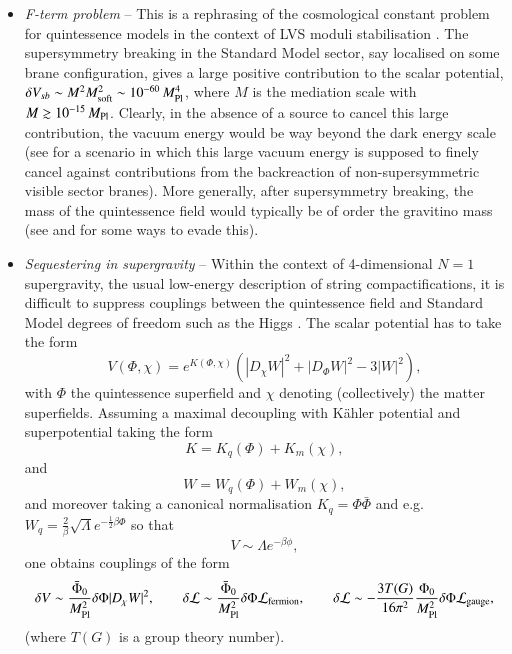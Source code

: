 \begin{itemize}
\item \emph{F-term problem} -- This is a rephrasing of the cosmological constant problem for quintessence models in the context of LVS moduli stabilisation \cite{Hebecker:2019csg}. The supersymmetry breaking in the Standard Model sector, say localised on some brane configuration, gives a large positive contribution to the scalar potential, $\delta V_{sb} \sim M^2 M_{\rm soft}^2 \sim 10^{-60}\,M_{\rm Pl}^4$, where $M$ is the mediation scale with $M\gtrsim 10^{-15}\,M_{\rm Pl}$. Clearly, in the absence of a source to cancel this large contribution, the vacuum energy would be way beyond the dark energy scale (see \cite{Cicoli:2012tz} for a scenario in which this large vacuum energy is supposed to finely cancel against contributions from the backreaction of non-supersymmetric visible sector branes). More generally, after supersymmetry breaking, the mass of the quintessence field would typically be of order the gravitino mass (see \cite{Chiang:2018jdg} and \cite{Cicoli:2018kdo} for some ways to evade this).
    
\item \emph{Sequestering in supergravity} -- Within the context of 4-dimensional $N=1$ supergravity, the usual low-energy description of string compactifications, it is difficult to suppress couplings between the quintessence field and Standard Model degrees of freedom such as the Higgs \cite{Denef:2018etk, Cicoli:2018kdo}. The scalar potential has to take the form 
\begin{equation}
V(\Phi, \chi)=e^{K(\Phi, \chi)}(|D_\chi W|^2 + |D_\Phi W|^2 - 3|W|^2),
\end{equation}
with $\Phi$ the quintessence superfield and $\chi$ denoting (collectively) the matter superfields. Assuming a maximal decoupling with K\"ahler potential and superpotential taking the form 
\begin{equation}
K=K_q(\Phi)+K_m(\chi),
\end{equation}
and 
\begin{equation}
W=W_q(\Phi) + W_m(\chi),
\end{equation}
and moreover taking a canonical normalisation $K_q = \Phi \bar{\Phi}$ and e.g. $W_q=\frac{2}{\beta}\sqrt{\Lambda} e^{-\frac12 \beta \Phi}$ so that \begin{equation}
V\sim \Lambda e^{-\beta \phi},
\end{equation}
one obtains couplings of the form 
\begin{equation}
\delta V \sim \frac{\bar{\Phi}_0}{M_{\rm Pl}^2} \delta\Phi |D_\chi W|^2, \qquad \delta \mathcal{L} \sim \frac{\bar{\Phi}_0}{M_{\rm Pl}^2} \delta\Phi \mathcal{L}_{\rm fermion}, \qquad \delta \mathcal{L} \sim -\frac{3T(G)}{16\pi^2} \frac{\Phi_0}{M_{\rm Pl}^2} \delta \Phi \mathcal{L}_{\rm gauge},
\end{equation}
(where $T(G)$ is a group theory number). 


\end{itemize}
